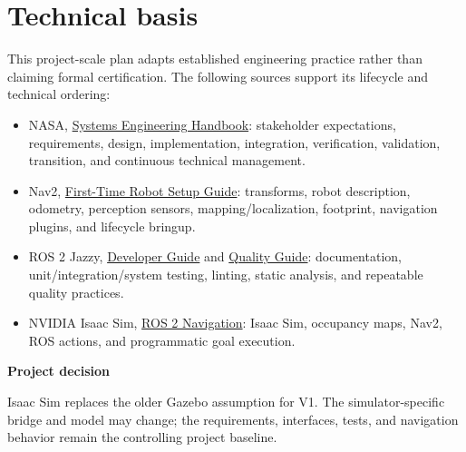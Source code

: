 \documentclass[10pt,a4paper]{article}
\begin{document}
\section{Technical basis}

This project-scale plan adapts established engineering practice rather than claiming formal certification. The following sources support its lifecycle and technical ordering:

\begin{itemize}
  \item NASA, \href{https://www.nasa.gov/reference/systems-engineering-handbook/}{Systems Engineering Handbook}: stakeholder expectations, requirements, design, implementation, integration, verification, validation, transition, and continuous technical management.
  \item Nav2, \href{https://docs.nav2.org/rolling/configuration_and_development/first_time_robot_setup_guide/}{First-Time Robot Setup Guide}: transforms, robot description, odometry, perception sensors, mapping/localization, footprint, navigation plugins, and lifecycle bringup.
  \item ROS 2 Jazzy, \href{https://docs.ros.org/en/jazzy/The-ROS2-Project/Contributing/Developer-Guide.html}{Developer Guide} and \href{https://docs.ros.org/en/jazzy/The-ROS2-Project/Contributing/Quality-Guide.html}{Quality Guide}: documentation, unit/integration/system testing, linting, static analysis, and repeatable quality practices.
  \item NVIDIA Isaac Sim, \href{https://docs.isaacsim.omniverse.nvidia.com/latest/ros2_tutorials/robot_control/tutorial_ros2_navigation.html}{ROS 2 Navigation}: Isaac Sim, occupancy maps, Nav2, ROS actions, and programmatic goal execution.
\end{itemize}

\vfill
\colorbox{Pale}{\parbox{0.965\linewidth}{
\textbf{Project decision}\par
Isaac Sim replaces the older Gazebo assumption for V1. The simulator-specific bridge and model may change; the requirements, interfaces, tests, and navigation behavior remain the controlling project baseline.
}}
\end{document}
